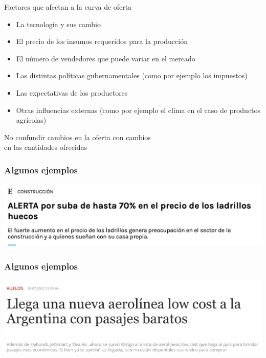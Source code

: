 \documentclass{beamer}
\begin{document}
\begin{frame}{Factores que afectan a la curva de oferta}
    \begin{itemize}
        \item La tecnología y sus cambio
        \item El precio de los insumos requeridos para la producción
        \item El número de vendedores que puede variar en el mercado
        \item Las distintas políticas gubernamentales (como por ejemplo los impuestos)
        \item Las expectativas de los productores
        \item Otras influencias externas (como por ejemplo el clima en el caso de productos agrícolas)  
    \end{itemize}
    \begin{boxB}
        \begin{center}
          No confundir cambios en la oferta con cambios \\ en las cantidades ofrecidas
        \end{center}
    \end{boxB}
\end{frame}

\begin{frame}
\frametitle{Algunos ejemplos}
    \begin{center}
    \includegraphics[scale=0.35]{../Figures/M6.1.png}
    \end{center}
\end{frame}

\begin{frame}
\frametitle{Algunos ejemplos}
    \begin{center}
    \includegraphics[scale=0.35]{../Figures/M6.2.png}
    \end{center}
\end{frame}
\end{document}
